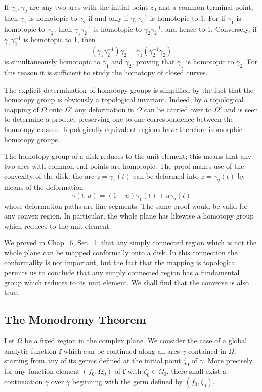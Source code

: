 If $\gamma_{1}, \gamma_{2}$ are any two arcs with the initial point $z_{0}$ and a common terminal point, then $\gamma_{1}$ is homotopic to $\gamma_{2}$ if and only if $\gamma_{1}\gamma_{2}^{-1}$ is homotopic to 1. For if $\gamma_{1}$ is homotopic to $\gamma_{2}$, then $\gamma_{1}\gamma_{2}^{-1}$ is homotopic to $\gamma_{2}\gamma_{2}^{-1}$, and hence to 1. Conversely, if $\gamma_{1}\gamma_{2}^{-1}$ is homotopic to 1, then
\begin{equation*}
(\gamma_ {1} \gamma_ {2} ^ {- 1}) \gamma_ {2} = \gamma_ {1} (\gamma_ {2} ^ {- 1} \gamma_ {2})
\end{equation*}
is simultaneously homotopic to $\gamma_{1}$ and $\gamma_{2}$, proving that $\gamma_{1}$ is homotopic to $\gamma_{2}$. For this reason it is sufficient to study the homotopy of closed curves.

The explicit determination of homotopy groups is simplified by the fact that the homotopy group is obviously a topological invariant. Indeed, by a topological mapping of $\Omega$ onto $\Omega'$ any deformation in $\Omega$ can be carried over to $\Omega'$ and is seen to determine a product preserving one-to-one correspondence between the homotopy classes. Topologically equivalent regions have therefore isomorphic homotopy groups.

The homotopy group of a disk reduces to the unit element; this means that any two arcs with common end points are homotopic. The proof makes use of the convexity of the disk: the arc $z = \gamma_{1}(t)$ can be deformed into $z = \gamma_{2}(t)$ by means of the deformation
\begin{equation*}
\gamma (t, u) = (1 - u) \gamma_ {1} (t) + u \gamma_ {2} (t)
\end{equation*}
whose deformation paths are line segments. The same proof would be valid for any convex region. In particular, the whole plane has likewise a homotopy group which reduces to the unit element.

We proved in Chap.~\hyperref[chap:6]{6}, Sec.~\hyperref[sec:6.1]{1}, that any simply connected region which is not the whole plane can be mapped conformally onto a disk. In this connection the conformality is not important, but the fact that the mapping is topological permits us to conclude that any simply connected region has a fundamental group which reduces to its unit element. We shall find that the converse is also true.


\setcounter{section}{1}\setcounter{subsection}{5}\subsection{The Monodromy Theorem}\label{sec:8.1.6}
Let $\Omega$ be a fixed region in the complex plane. We consider the case of a global analytic function $\mathbf{f}$ which can be continued along all arcs $\gamma$ contained in $\Omega$, starting from any of its germs defined at the initial point $\zeta_0$ of $\gamma$. More precisely, for any function element $(f_0,\Omega_0)$ of $\mathbf{f}$ with $\zeta_0\in \Omega_0$, there shall exist a continuation $\overline{\gamma}$ over $\gamma$ beginning with the germ defined by $(f_0,\zeta_0)$.

